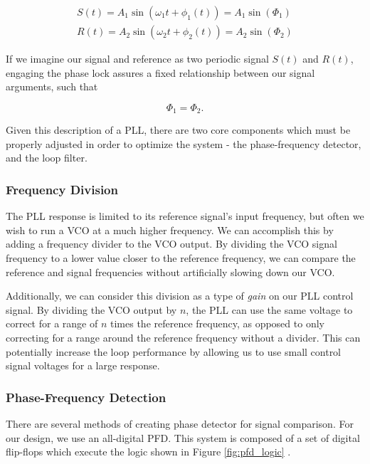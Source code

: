 \begin{eqnarray}
  \label{eq:pll_eq}
  S(t) = A_1 \sin \left(\omega_1 t + \phi_1(t)\right) = A_1 \sin (\Phi_1) \\
  R(t) = A_2 \sin \left(\omega_2 t + \phi_2(t)\right) = A_2 \sin (\Phi_2) 
\end{eqnarray}

\noindent
If we imagine our signal and reference as two periodic signal $S(t)$ and $R(t)$, engaging the phase lock assures a fixed relationship between our signal arguments, such that 

\begin{equation}
  \label{eq:pll_def}
  \Phi_1=\Phi_2.
\end{equation}

\noindent
Given this description of a PLL, there are two core components which must be properly adjusted in order to optimize the system - the phase-frequency detector, and the loop filter.


\subsubsection{Frequency Division}

The PLL response is limited to its reference signal's input frequency, but often we wish to run a VCO at a much higher frequency.  We can accomplish this by adding a frequency divider to the VCO output.  By dividing the VCO signal frequency to a lower value closer to the reference frequency, we can compare the reference and signal frequencies without artificially slowing down our VCO.  

Additionally, we can consider this division as a type of \emph{gain} on our PLL control signal.  By dividing the VCO output by $n$, the PLL can use the same voltage to correct for a range of $n$ times the reference frequency, as opposed to only correcting for a range around the reference frequency without a divider.  This can potentially increase the loop performance by allowing us to use small control signal voltages for a large response.



\subsubsection{Phase-Frequency Detection}

There are several methods of creating phase detector for signal comparison.  For our design, we use an all-digital PFD.  This system is composed of a set of digital flip-flops which execute the logic shown in Figure \ref{fig:pfd_logic} \cite{mch12140}.

